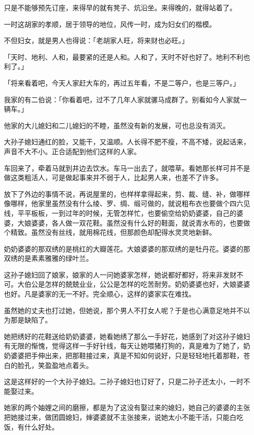 \documentclass[UTF8]{ctexart}
\begin{document}
只是不能够预先订座，来得早的就有凳子、炕沿坐。来得晚的，就得站着了。

一时这胡家的孝顺，居于领导的地位，风传一时，成为妇女们的楷模。

不但妇女，就是男人也得说：「老胡家人旺，将来财也必旺。」

「天时、地利、人和，最要紧的还是人和。人和了，天时不好也好了。地利不利也利了。」

「将来看着吧，今天人家赶大车的，再过五年看，不是二等户，也是三等户。」

我家的有二伯说：「你看着吧，过不了几年人家就骡马成群了。别看如今人家就一辆车。」

他家的大儿媳妇和二儿媳妇的不睦，虽然没有新的发展，可也总没有消灭。

大孙子媳妇通红的脸，又能干，又温顺。人长得不肥不瘦，不高不矮，说起话来，声音不大不小。正合适配到他们这样的人家。

车回来了，牵着马就到井边去饮水。车马一出去了，就喂草。看她那长样可并不是做这类粗活人，可是做起事来并不弱于人，比起男人来，也差不了许多。

放下了外边的事情不说，再说屋里的，也样样拿得起来，剪、裁、缝、补，做哪样像哪样，他家里虽然没有什么绫、罗、绸、缎可做的，就说粗布衣也要做个四六见线，平平板板，一到过年的时候，无管怎样忙，也要偷空给奶奶婆婆，自己的婆婆，大娘婆婆，各人做一双花鞋。虽然没有什么好的鞋面，就说青水布的，也要做个精致。虽然没有丝线，就用棉花线，但那颜色却配得水灵灵地新鲜。

奶奶婆婆的那双绣的是桃红的大瓣莲花。大娘婆婆的那双绣的是牡丹花。婆婆的那双绣的是素素雅雅的绿叶兰。

这孙子媳妇回了娘家，娘家的人一问她婆家怎样，她说都好都好，将来非发财不可。大伯公是怎样的兢兢业业，公公是怎样的吃苦耐劳。奶奶婆婆也好，大娘婆婆也好。凡是婆家的无一不好。完全顺心，这样的婆家实在难找。

虽然她的丈夫也打过她，但她说，那个男人不打女人呢？于是也心满意足地并不以为那是缺陷了。

她把绣好的花鞋送给奶奶婆婆，她看她绣了那么一手好花，她感到了对这孙子媳妇有无限的惭愧，觉得这样一手好针线，每天让她喂猪打狗的，真是难为了她了，奶奶婆婆把手伸出来，把那鞋接过来，真是不知如何说好，只是轻轻地托着那鞋，苍白的脸孔，笑盈盈地点着头。

这是这样好的一个大孙子媳妇。二孙子媳妇也订好了，只是二孙子还太小，一时不能娶过来。

她家的两个妯娌之间的磨擦，都是为了这没有娶过来的媳妇，她自己的婆婆的主张把她接过来，做团圆媳妇，婶婆婆就不主张接来，说她太小不能干活，只能白吃饭，有什么好处。
\end{document}
